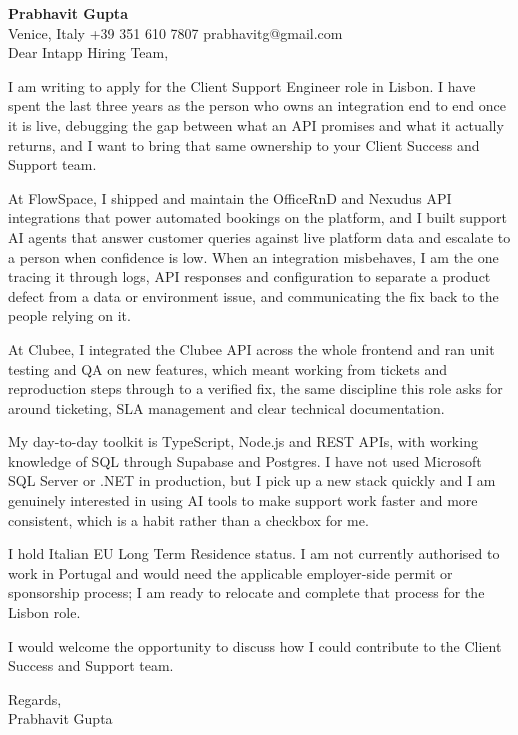 \documentclass[a4paper,10.5pt]{article}
\begin{document}
\textbf{Prabhavit Gupta}\\
Venice, Italy \textbar{} +39 351 610 7807 \textbar{} prabhavitg@gmail.com\\[10pt]
Dear Intapp Hiring Team,

I am writing to apply for the Client Support Engineer role in Lisbon. I have spent the last three years as the person who owns an integration end to end once it is live, debugging the gap between what an API promises and what it actually returns, and I want to bring that same ownership to your Client Success and Support team.

At FlowSpace, I shipped and maintain the OfficeRnD and Nexudus API integrations that power automated bookings on the platform, and I built support AI agents that answer customer queries against live platform data and escalate to a person when confidence is low. When an integration misbehaves, I am the one tracing it through logs, API responses and configuration to separate a product defect from a data or environment issue, and communicating the fix back to the people relying on it.

At Clubee, I integrated the Clubee API across the whole frontend and ran unit testing and QA on new features, which meant working from tickets and reproduction steps through to a verified fix, the same discipline this role asks for around ticketing, SLA management and clear technical documentation.

My day-to-day toolkit is TypeScript, Node.js and REST APIs, with working knowledge of SQL through Supabase and Postgres. I have not used Microsoft SQL Server or .NET in production, but I pick up a new stack quickly and I am genuinely interested in using AI tools to make support work faster and more consistent, which is a habit rather than a checkbox for me.

I hold Italian EU Long Term Residence status. I am not currently authorised to work in Portugal and would need the applicable employer-side permit or sponsorship process; I am ready to relocate and complete that process for the Lisbon role.

I would welcome the opportunity to discuss how I could contribute to the Client Success and Support team.

Regards,\\
Prabhavit Gupta
\end{document}
